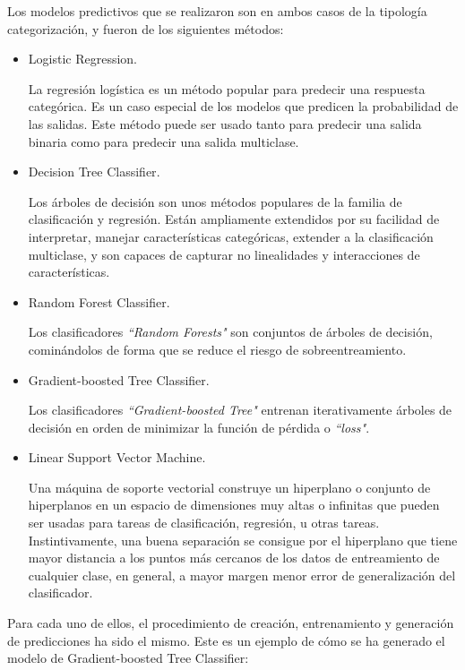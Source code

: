 Los modelos predictivos que se realizaron son en ambos casos de la tipología categorización, y fueron de los siguientes métodos:
\begin{itemize}
    \item Logistic Regression\cite{lr}.
    
La regresión logística es un método popular para predecir una respuesta categórica. Es un caso especial de los modelos  que predicen la probabilidad de las salidas. Este método puede ser usado tanto para predecir una salida binaria como para predecir una salida multiclase.

    \item Decision Tree Classifier\cite{dtc}.
    
Los árboles de decisión son unos métodos populares de la familia de clasificación y regresión.
Están ampliamente extendidos por su facilidad de interpretar, manejar características categóricas, extender a la clasificación multiclase, y son capaces de capturar no linealidades y interacciones de características.

    \item Random Forest Classifier\cite{rfc}.
    
Los clasificadores \textit{``Random Forests"} son conjuntos de árboles de decisión, cominándolos de forma que se reduce el riesgo de sobreentreamiento.

    \item Gradient-boosted Tree Classifier\cite{gbt}.
    
Los clasificadores \textit{``Gradient-boosted Tree"} entrenan iterativamente árboles de decisión en orden de minimizar la función de pérdida o \textit{``loss"}.

    \item Linear Support Vector Machine\cite{lsvm}.
    
Una máquina de soporte vectorial construye un hiperplano o conjunto de hiperplanos en un espacio de dimensiones muy altas o infinitas que pueden ser usadas para tareas de clasificación, regresión, u otras tareas. Instintivamente, una buena separación se consigue por el hiperplano que tiene mayor distancia a los puntos más cercanos de los datos de entreamiento de cualquier clase, en general, a mayor margen menor error de generalización del clasificador.

\end{itemize}

Para cada uno de ellos, el procedimiento de creación, entrenamiento y generación de predicciones ha sido el mismo.
Este es un ejemplo de cómo se ha generado el modelo de Gradient-boosted Tree Classifier:

